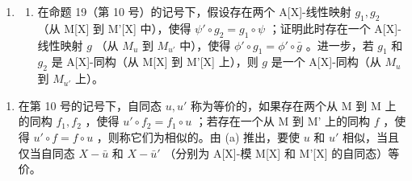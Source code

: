 \begin{enumerate}
\def\labelenumi{\arabic{enumi}.}
\setcounter{enumi}{25}
\tightlist
\item
  \begin{enumerate}
  \def\labelenumii{(\alph{enumii})}
  \tightlist
  \item
    在命题 19（第 10 号）的记号下，假设存在两个 A{[}X{]}-线性映射 \(g_1, g_2\) （从 M{[}X{]} 到 M'{[}X{]} 中），使得 \(\psi' \circ g_2 = g_1 \circ \psi\) ；证明此时存在一个 A{[}X{]}-线性映射 \(g\) （从 \(M_u\) 到 \(M_{u'}\) 中），使得 \(\phi' \circ g_1 = \phi' \circ \bar{g}\) 。进一步，若 \(g_1\) 和 \(g_2\) 是 A{[}X{]}-同构（从 M{[}X{]} 到 M'{[}X{]} 上），则 \(g\) 是一个 A{[}X{]}-同构（从 \(M_u\) 到 \(M_{u'}\) 上）。
  \end{enumerate}
\end{enumerate}

\begin{enumerate}
\def\labelenumi{(\alph{enumi})}
\setcounter{enumi}{1}
\tightlist
\item
  在第 10 号的记号下，自同态 \(u, u'\) 称为等价的，如果存在两个从 M 到 M 上的同构 \(f_1, f_2\) ，使得 \(u' \circ f_2 = f_1 \circ u\) ；若存在一个从 M 到 M' 上的同构 \(f\) ，使得 \(u' \circ f = f \circ u\) ，则称它们为相似的。由 (a) 推出，要使 \(u\) 和 \(u'\) 相似，当且仅当自同态 \(X - \bar{u}\) 和 \(X - \bar{u}'\) （分别为 A{[}X{]}-模 M{[}X{]} 和 M'{[}X{]} 的自同态）等价。
\end{enumerate}


